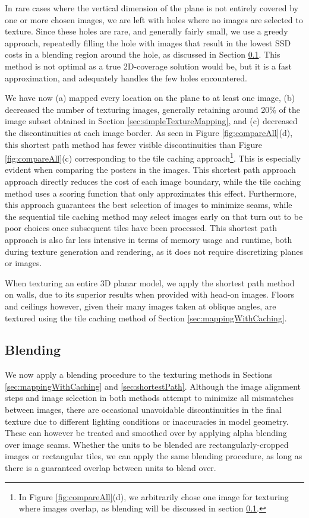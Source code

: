 \documentclass[]{spie}  %
\begin{document}
In rare cases where the vertical dimension of the plane is not
entirely covered by one or more chosen images, we are left with holes
where no images are selected to texture. Since these holes are rare,
and generally fairly small, we use a greedy approach, repeatedly
filling the hole with images that result in the lowest SSD costs in a
blending region around the hole, as discussed in Section
\ref{sec:blending}. This method is not optimal as a true 2D-coverage
solution would be, but it is a fast approximation, and adequately
handles the few holes encountered.

We have now (a) mapped every location on the plane to at least one
image, (b) decreased the number of texturing images, generally
retaining around 20\% of the image subset obtained in Section
\ref{sec:simpleTextureMapping}, and (c) decreased the discontinuities
at each image border. As seen in Figure \ref{fig:compareAll}(d), this
shortest path method has fewer visible discontinuities than Figure
\ref{fig:compareAll}(c) corresponding to the tile caching
approach\footnote{In Figure \ref{fig:compareAll}(d), we arbitrarily
  chose one image for texturing where images overlap, as blending will
  be discussed in section \ref{sec:blending}.}. This is especially
evident when comparing the posters in the images. This shortest path
approach approach directly reduces the cost of each image boundary,
while the tile caching method uses a scoring function that only
approximates this effect. Furthermore, this approach guarantees the
best selection of images to minimize seams, while the sequential tile
caching method may select images early on that turn out to be poor
choices once subsequent tiles have been processed. This shortest path
approach is also far less intensive in terms of memory usage and
runtime, both during texture generation and rendering, as it does not
require discretizing planes or images.

When texturing an entire 3D planar model, we apply the shortest path
method on walls, due to its superior results when provided with
head-on images. Floors and ceilings however, given their many images
taken at oblique angles, are textured using the tile caching method of
Section \ref{sec:mappingWithCaching}.


\subsection{Blending}
\label{sec:blending}
We now apply a blending procedure to the texturing methods in Sections
\ref{sec:mappingWithCaching} and \ref{sec:shortestPath}. Although the
image alignment steps and image selection in both methods attempt to
minimize all mismatches between images, there are occasional
unavoidable discontinuities in the final texture due to different
lighting conditions or inaccuracies in model geometry. These can
however be treated and smoothed over by applying alpha blending over
image seams.  Whether the units to be blended are
rectangularly-cropped images or rectangular tiles, we can apply the
same blending procedure, as long as there is a guaranteed overlap
between units to blend over.
\end{document}
